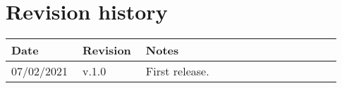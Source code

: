 \chapter*{Revision history}

\begin{center}
	\begin{tabular}{@{}p{0.18\linewidth} p{0.18\linewidth} p{0.57\linewidth}@{}}
		\toprule
		\textbf{Date} & \textbf{Revision} & \textbf{Notes}\\
		\midrule
		07/02/2021 & v.1.0 & First release.\\
		\bottomrule
	\end{tabular}
\end{center}